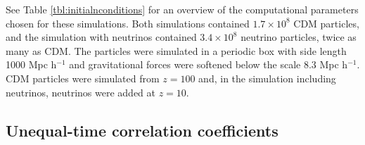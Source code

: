 \documentclass[twocolumn,superscriptaddress,prd]{revtex4}
\begin{document}
See Table \ref{tbl:initialnconditions} for an overview of the
computational parameters chosen for these simulations.  Both
simulations contained $1.7 \times 10^{8}$ CDM particles, and the
simulation with neutrinos contained $3.4 \times 10^{8}$ neutrino
particles, twice as many as CDM.  The
particles were simulated in a periodic box with side length 1000 Mpc h$^{-1}$ and
gravitational forces were softened below the scale 8.3 Mpc h$^{-1}$.  CDM
particles were simulated from $z=100$ and, in the simulation including
neutrinos, neutrinos were added at $z=10$.







 

\subsection{Unequal-time correlation coefficients}
\label{sec:Correlators}
\end{document}
